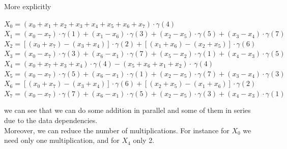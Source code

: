      	\bigskip
 More explicitly
 \begin{flushleft}
 \qquad	\quad$ X_{0}= (x_{0}+ x_{1} +x_{2}+x_{3}+ x_{4} + x_{5} +x_{6} +x_{7})\cdot \gamma(4)$\\
 \qquad	\quad	$  X_{1}=(x_{0}-x_{7})\cdot \gamma(1)+(x_{1}-x_{6})\cdot \gamma(3)+(x_{2}-x_{5})\cdot \gamma(5)+(x_{3}-x_{4})\cdot \gamma(7)$\\
 \qquad	\quad	$  X_{2}=[(x_{0}+x_{7})-(x_{3}+ x_{4})]\cdot \gamma(2)+ [(x_{1}+x_{6})-(x_{2}+x_{5})]\cdot \gamma(6)$\\
 \qquad	\quad	$   X_{3}=(x_{0}-x_{7})\cdot \gamma(3)+(x_{6}-x_{1})\cdot \gamma(7)+(x_{5}-x_{2})\cdot \gamma(1)+(x_{4}-x_{3})\cdot \gamma(5)$\\
 \qquad	\quad	$  X_{4}=(x_{0}+ x_{7} +x_{3}+ x_{4})\cdot \gamma(4)-( x_{5} +x_{6} +x_{1}+x_{2})\cdot\ \gamma(4)$\\
 \qquad	\quad	$  X_{5}=(x_{0}-x_{7})\cdot \gamma(5)+(x_{6}-x_{1})\cdot \gamma(1)+(x_{2}-x_{5})\cdot \gamma(7)+(x_{3}-x_{4})\cdot \gamma(3)$\\
 \qquad	\quad	$  X_{6}=[(x_{0}+x_{7})-(x_{3}+ x_{4})]\cdot \gamma(6)+ [(x_{2}+x_{5})-(x_{1}+x_{6})]\cdot \gamma(2)$\\
 \qquad	\quad	$  X_{7}=(x_{0}-x_{7})\cdot \gamma(7)+(x_{6}-x_{1})\cdot \gamma(5)+(x_{2}-x_{5})\cdot \gamma(3)+(x_{4}-x_{3})\cdot \gamma(1)$\\
 \end{flushleft}
 \bigskip
 we can see that we can do some addition in parallel and some of them in series due to the data dependencies.\\
 Moreover, we can reduce the number of multiplications. For instance for $ X_{0} $ we need only one multiplication, and for $ X_{4} $ only 2.
